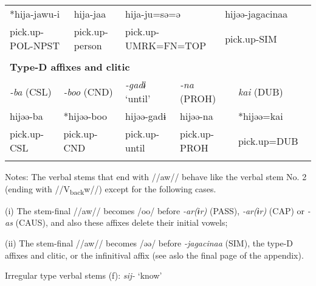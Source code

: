 \begin{tabularx}{\textwidth}{XXXXXXXm{}XXXXXXXXXXX}
\multicolumn{3}{X}{{ *hija-jawu-i}} & \multicolumn{2}{X}{hija-jaa} & \multicolumn{5}{X}{hija-ju=sə=ə} & \multicolumn{9}{X}{{ hijəə-jagacinaa}}\\
\multicolumn{3}{X}{pick.up-POL-NPST} & \multicolumn{2}{X}{pick.up-person} & \multicolumn{5}{X}{pick.up-UMRK=FN=TOP} & \multicolumn{9}{X}{pick.up-SIM}\\
\multicolumn{19}{X}{}\\
\multicolumn{19}{X}{{\bfseries Type-D affixes and clitic}}\\
\multicolumn{2}{X}{{ \textit{{}-ba} (CSL)}} & \multicolumn{3}{X}{{ \textit{{}-boo} (CND)}} & \multicolumn{2}{X}{{ \textit{{}-gadɨ} ‘until’}} & \multicolumn{4}{X}{{ \textit{{}-na} (PROH)}} & \multicolumn{8}{X}{{ \textit{kai} (DUB)}}\\
\multicolumn{2}{X}{{ hijəə-ba}} & \multicolumn{3}{X}{{ *hijəə-boo}} & \multicolumn{2}{X}{{ hijəə-gadɨ}} & \multicolumn{4}{X}{{ hijəə-na}} & \multicolumn{8}{X}{{ *hijəə=kai}}\\
\multicolumn{2}{X}{pick.up-CSL} & \multicolumn{3}{X}{pick.up-CND} & \multicolumn{2}{X}{pick.up-until} & \multicolumn{4}{X}{pick.up-PROH} & \multicolumn{8}{X}{pick.up=DUB}\\
\lspbottomrule
\end{tabularx}
Notes: The verbal stems that end with //aw// behave like the verbal stem No. 2 (ending with //V\textsubscript{back}w//) except for the following cases.

(i)  The stem-final //aw// becomes /oo/ before \textit{{}-ar(ɨr)} (PASS), \textit{{}-ar(ɨr)} (CAP) or \textit{{}-as} (CAUS), and also these affixes delete their initial vowels;

(ii)  The stem-final //aw// becomes /əə/ before \textit{{}-jagacinaa} (SIM), the type-D affixes and clitic, or the infinitival affix (see aslo the final page of the appendix).

Irregular type verbal stems (f): \textit{sij-} ‘know’

\tablefirsthead{}

